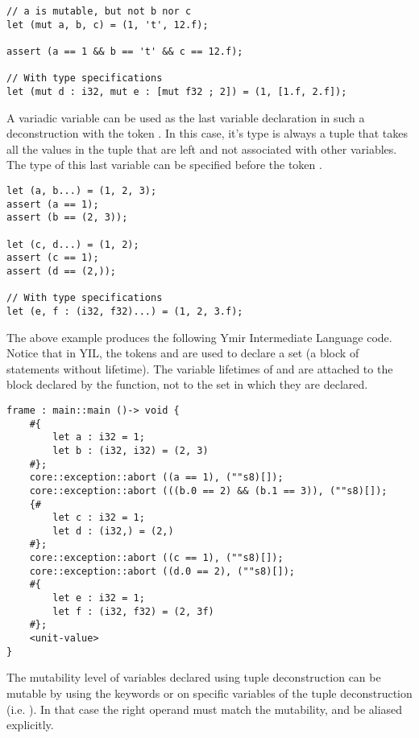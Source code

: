 \begin{lstlisting}[style=coloredverbatim]
  // a is mutable, but not b nor c
let (mut a, b, c) = (1, 't', 12.f);

assert (a == 1 && b == 't' && c == 12.f);

// With type specifications
let (mut d : i32, mut e : [mut f32 ; 2]) = (1, [1.f, 2.f]);
\end{lstlisting}

A variadic variable can be used as the last variable declaration in such a
deconstruction with the token . In this case, it's type is always a
tuple that takes all the values in the tuple that are left and not associated
with other variables. The type of this last variable can be specified before the
token .

\begin{lstlisting}[style=coloredverbatim]
let (a, b...) = (1, 2, 3);
assert (a == 1);
assert (b == (2, 3));

let (c, d...) = (1, 2);
assert (c == 1);
assert (d == (2,));

// With type specifications
let (e, f : (i32, f32)...) = (1, 2, 3.f);
\end{lstlisting}

The above example produces the following Ymir Intermediate Language code. Notice
that in YIL, the tokens \token{\#\{} and \token{\#\} } are used to declare a
set (a block of statements without lifetime). The variable lifetimes of 
and  are attached to the block declared by the function, not to the
set in which they are declared.

\begin{lstlisting}[style=intermediateVerb]
frame : main::main ()-> void {
    #{
        let a : i32 = 1;
        let b : (i32, i32) = (2, 3)
    #};
    core::exception::abort ((a == 1), (""s8)[]);
    core::exception::abort (((b.0 == 2) && (b.1 == 3)), (""s8)[]);
    {#
        let c : i32 = 1;
        let d : (i32,) = (2,)
    #};
    core::exception::abort ((c == 1), (""s8)[]);
    core::exception::abort ((d.0 == 2), (""s8)[]);
    #{
        let e : i32 = 1;
        let f : (i32, f32) = (2, 3f)
    #};
    <unit-value>
}
\end{lstlisting}

The mutability level of variables declared using tuple deconstruction can be
mutable by using the keywords  or  on specific
variables of the tuple deconstruction (i.e. ). In that case the right operand must match the mutability, and be aliased
explicitly.

